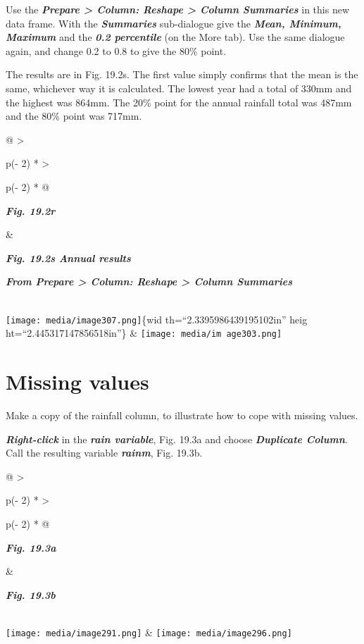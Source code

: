 \documentclass[
  letterpaper,
  DIV=11,
  numbers=noendperiod]{scrreprt}
\begin{document}
Use the \textbf{\emph{Prepare \textgreater{} Column: Reshape
\textgreater{} Column Summaries}} in this new data frame. With the
\textbf{\emph{Summaries}} sub-dialogue give the \textbf{\emph{Mean,
Minimum,}} \textbf{\emph{Maximum}} and the \textbf{\emph{0.2
percentile}} (on the More tab). Use the same dialogue again, and change
0.2 to 0.8 to give the 80\% point.

The results are in Fig. 19.2s. The first value simply confirms that the
mean is the same, whichever way it is calculated. The lowest year had a
total of 330mm and the highest was 864mm. The 20\% point for the annual
rainfall total was 487mm and the 80\% point was 717mm.

\begin{longtable}[]{@{}
  >{\raggedright\arraybackslash}p{(\columnwidth - 2\tabcolsep) * }
  >{\raggedright\arraybackslash}p{(\columnwidth - 2\tabcolsep) * }@{}}
\toprule\noalign{}
\begin{minipage}[b]{\linewidth}\raggedright
\textbf{\emph{Fig. 19.2r}}
\end{minipage} & \begin{minipage}[b]{\linewidth}\raggedright
\textbf{\emph{Fig. 19.2s Annual results}}

\textbf{\emph{From Prepare \textgreater{} Column: Reshape \textgreater{}
Column Summaries}}
\end{minipage} \\
\midrule\noalign{}
\endhead
\bottomrule\noalign{}
\endlastfoot
\texttt{[image: media/image307.png]}\{wid th=``2.3395986439195102in''
heig ht=``2.445317147856518in''\} &
\texttt{[image: media/im age303.png]} \\
\end{longtable}

\section{Missing values}\label{missing-values}

Make a copy of the rainfall column, to illustrate how to cope with
missing values.

\textbf{\emph{Right-click}} in the \textbf{\emph{rain variable}}, Fig.
19.3a and choose \textbf{\emph{Duplicate Column}}. Call the resulting
variable \textbf{\emph{rainm}}, Fig. 19.3b.

\begin{longtable}[]{@{}
  >{\raggedright\arraybackslash}p{(\columnwidth - 2\tabcolsep) * }
  >{\raggedright\arraybackslash}p{(\columnwidth - 2\tabcolsep) * }@{}}
\toprule\noalign{}
\begin{minipage}[b]{\linewidth}\raggedright
\textbf{\emph{Fig. 19.3a}}
\end{minipage} & \begin{minipage}[b]{\linewidth}\raggedright
\textbf{\emph{Fig. 19.3b}}
\end{minipage} \\
\midrule\noalign{}
\endhead
\bottomrule\noalign{}
\endlastfoot
\texttt{[image: media/image291.png]} &
\texttt{[image: media/image296.png]} \\
\end{longtable}
\end{document}
